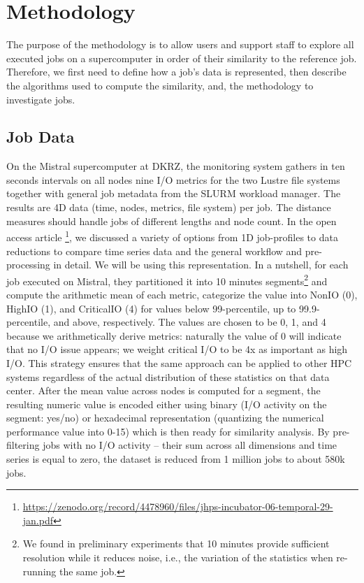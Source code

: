 \documentclass{jhps}
\begin{document}
\section{Methodology}
\label{sec:methodology}

The purpose of the methodology is to allow users and support staff to explore all executed jobs on a supercomputer in order of their similarity to the reference job.
Therefore, we first need to define how a job's data is represented, then describe the algorithms used to compute the similarity, and, the methodology to investigate jobs.

\subsection{Job Data}
On the Mistral supercomputer at DKRZ, the monitoring system \cite{betke20} gathers in ten seconds intervals on all nodes nine I/O metrics for the two Lustre file systems together with general job metadata from the SLURM workload manager.
The results are 4D data (time, nodes, metrics, file system) per job.
The distance measures should handle jobs of different lengths and node count.
In the open access article \cite{Eugen20HPS}\footnote{\url{https://zenodo.org/record/4478960/files/jhps-incubator-06-temporal-29-jan.pdf}}, we discussed a variety of options from 1D job-profiles to data reductions to compare time series data and the general workflow and pre-processing in detail. 
We will be using this representation.
In a nutshell, for each job executed on Mistral, they partitioned it into 10 minutes segments\footnote{We found in preliminary experiments that 10 minutes provide sufficient resolution while it reduces noise, i.e., the variation of the statistics when re-running the same job.} and compute the arithmetic mean of each metric, categorize the value into NonIO (0), HighIO (1), and CriticalIO (4) for values below 99-percentile, up to 99.9-percentile, and above, respectively. 
The values are chosen to be 0, 1, and 4 because we arithmetically derive metrics: naturally the value of 0 will indicate that no I/O issue appears; we weight critical I/O to be 4x as important as high I/O.
This strategy ensures that the same approach can be applied to other HPC systems regardless of the actual distribution of these statistics on that data center.
After the mean value across nodes is computed for a segment, the resulting numeric value is encoded either using binary (I/O activity on the segment: yes/no) or hexadecimal representation (quantizing the numerical performance value into 0-15) which is then ready for similarity analysis.
By pre-filtering jobs with no I/O activity -- their sum across all dimensions and time series is equal to zero, the dataset is reduced from 1 million jobs to about 580k jobs.
\end{document}

